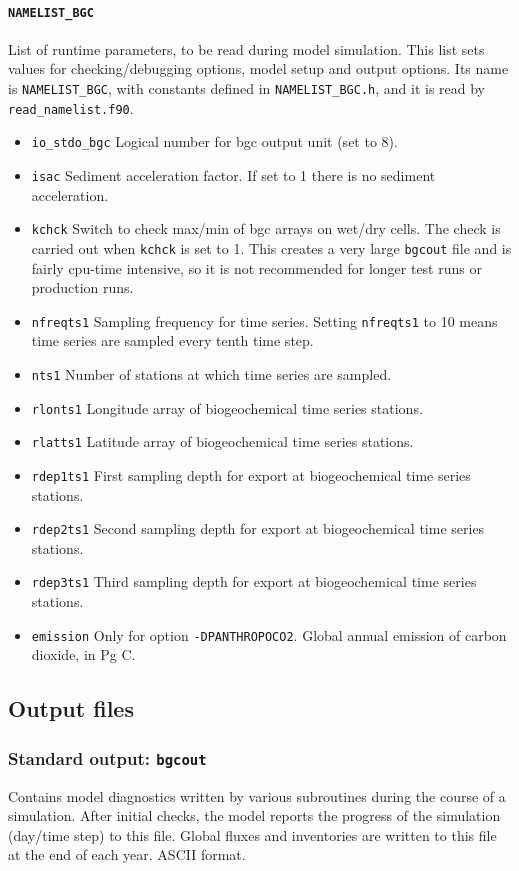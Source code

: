 \documentclass[11pt,a4paper,fleqn,twoside]{article}
\begin{document}
\paragraph{\tt NAMELIST\_BGC} List of runtime parameters, to be read during model
simulation. This list sets values for checking/debugging options, model setup
and output options. Its name is {\tt NAMELIST\_BGC}, with constants defined in
{\tt NAMELIST\_BGC.h}, and it is read by {\tt read\_namelist.f90}. 
\begin{itemize}
\item{\tt io\_stdo\_bgc}  Logical number for bgc output unit (set to 8).
\item{\tt isac} Sediment acceleration factor. If set to 1 there is no
sediment acceleration. 
\item{\tt kchck}  Switch to check max/min of bgc arrays on wet/dry
cells. The check is carried out when {\tt kchck} is set to 1. This creates
a very large {\tt bgcout} file and is fairly cpu-time intensive, 
so it is not recommended for longer test runs or production runs.
\item{\tt  nfreqts1} Sampling frequency for time series. Setting {\tt  nfreqts1} to 10 means
time series are sampled every tenth time step.
\item{\tt  nts1}  Number of stations at which time series are sampled.
\item{\tt  rlonts1} Longitude array of biogeochemical time series  stations.  
\item{\tt  rlatts1} Latitude array of biogeochemical time series  stations.  
\item{\tt  rdep1ts1} First sampling depth for export at biogeochemical
time series  stations.  
\item{\tt  rdep2ts1} Second sampling depth for export at biogeochemical
time series  stations.  
\item{\tt  rdep3ts1} Third sampling depth for export at biogeochemical time series 
stations.  
\item{\tt  emission} Only for option {\tt -DPANTHROPOCO2}. Global annual emission
of carbon dioxide, in Pg C.  
\end{itemize}


\subsection{\label{output_files}Output files}

\subsubsection{Standard output: {\tt bgcout}} Contains model diagnostics
written by various subroutines during the course of a simulation. After initial
checks, the model reports the progress of the simulation (day/time step) to this
file. Global fluxes and inventories are written to this file at the end of each
year. ASCII format.
\end{document}
